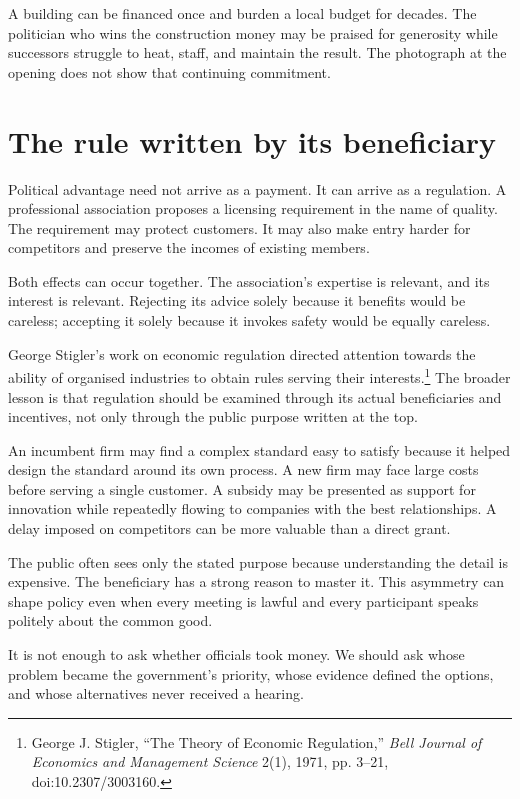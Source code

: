 \documentclass[12pt,a4paper]{book}
\begin{document}
A building can be financed once and burden a local budget for decades. The politician who wins the construction money may be praised for generosity while successors struggle to heat, staff, and maintain the result. The photograph at the opening does not show that continuing commitment.

\section*{The rule written by its beneficiary}

Political advantage need not arrive as a payment. It can arrive as a regulation. A professional association proposes a licensing requirement in the name of quality. The requirement may protect customers. It may also make entry harder for competitors and preserve the incomes of existing members.

Both effects can occur together. The association's expertise is relevant, and its interest is relevant. Rejecting its advice solely because it benefits would be careless; accepting it solely because it invokes safety would be equally careless.

George Stigler's work on economic regulation directed attention towards the ability of organised industries to obtain rules serving their interests.\footnote{George J. Stigler, ``The Theory of Economic Regulation,'' \emph{Bell Journal of Economics and Management Science} 2(1), 1971, pp. 3--21, doi:10.2307/3003160.} The broader lesson is that regulation should be examined through its actual beneficiaries and incentives, not only through the public purpose written at the top.

An incumbent firm may find a complex standard easy to satisfy because it helped design the standard around its own process. A new firm may face large costs before serving a single customer. A subsidy may be presented as support for innovation while repeatedly flowing to companies with the best relationships. A delay imposed on competitors can be more valuable than a direct grant.

The public often sees only the stated purpose because understanding the detail is expensive. The beneficiary has a strong reason to master it. This asymmetry can shape policy even when every meeting is lawful and every participant speaks politely about the common good.

It is not enough to ask whether officials took money. We should ask whose problem became the government's priority, whose evidence defined the options, and whose alternatives never received a hearing.
\end{document}
